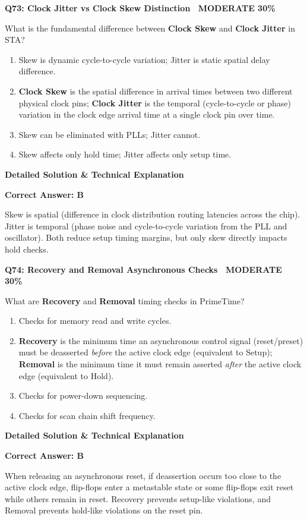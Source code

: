 \documentclass[11pt,a4paper]{article}
\newcommand{\badgemod}{{\color{white}\colorbox{modoran}{\bfseries\sffamily\tiny\ MODERATE 30\%\ }}}
\newenvironment{qbox}[2]{%
  \begin{mdframed}[style=qstyle]%
  {\bfseries\sffamily\color{primaryblue}#1 \hfill #2}\par\vspace{2pt}%
}{%
  \end{mdframed}%
}
\newenvironment{ansbox}{%
  \begin{mdframed}[style=ansstyle]%
  {\bfseries\sffamily\color{ansgreen}\small Detailed Solution \& Technical Explanation}\par\vspace{2pt}\small%
}{%
  \end{mdframed}%
}
\begin{document}
\begin{qbox}{Q73: Clock Jitter vs Clock Skew Distinction}{\badgemod}
What is the fundamental difference between \textbf{Clock Skew} and \textbf{Clock Jitter} in STA?
\begin{enumerate}[label=\textbf{\Alph*.}]
  \item Skew is dynamic cycle-to-cycle variation; Jitter is static spatial delay difference.
  \item \textbf{Clock Skew} is the spatial difference in arrival times between two different physical clock pins; \textbf{Clock Jitter} is the temporal (cycle-to-cycle or phase) variation in the clock edge arrival time at a single clock pin over time.
  \item Skew can be eliminated with PLLs; Jitter cannot.
  \item Skew affects only hold time; Jitter affects only setup time.
\end{enumerate}
\end{qbox}
\begin{ansbox}
\textbf{Correct Answer: B}

Skew is spatial (difference in clock distribution routing latencies across the chip). Jitter is temporal (phase noise and cycle-to-cycle variation from the PLL and oscillator). Both reduce setup timing margins, but only skew directly impacts hold checks.
\end{ansbox}

\begin{qbox}{Q74: Recovery and Removal Asynchronous Checks}{\badgemod}
What are \textbf{Recovery} and \textbf{Removal} timing checks in PrimeTime?
\begin{enumerate}[label=\textbf{\Alph*.}]
  \item Checks for memory read and write cycles.
  \item \textbf{Recovery} is the minimum time an asynchronous control signal (reset/preset) must be deasserted \textit{before} the active clock edge (equivalent to Setup); \textbf{Removal} is the minimum time it must remain asserted \textit{after} the active clock edge (equivalent to Hold).
  \item Checks for power-down sequencing.
  \item Checks for scan chain shift frequency.
\end{enumerate}
\end{qbox}
\begin{ansbox}
\textbf{Correct Answer: B}

When releasing an asynchronous reset, if deassertion occurs too close to the active clock edge, flip-flops enter a metastable state or some flip-flops exit reset while others remain in reset. Recovery prevents setup-like violations, and Removal prevents hold-like violations on the reset pin.
\end{ansbox}
\end{document}
